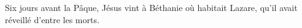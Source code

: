 Six jours avant la Pâque,
	Jésus vint à Béthanie où habitait Lazare,
	qu’il avait réveillé d’entre les morts.

